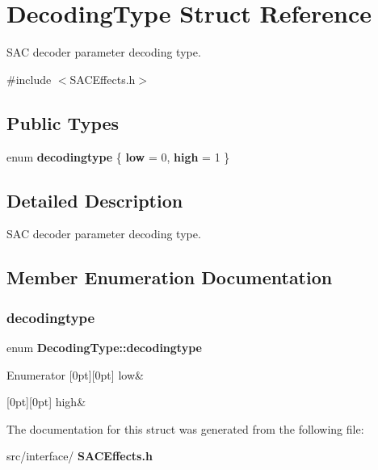 \section{Decoding\+Type Struct Reference}
\label{struct_decoding_type}


S\+AC decoder parameter decoding type.  




{\ttfamily \#include $<$S\+A\+C\+Effects.\+h$>$}

\subsection*{Public Types}
\begin{DoxyCompactItemize}
\item 
enum \textbf{ decodingtype} \{ \textbf{ low} = 0, 
\textbf{ high} = 1
 \}
\end{DoxyCompactItemize}


\subsection{Detailed Description}
S\+AC decoder parameter decoding type. 

\subsection{Member Enumeration Documentation}
\mbox{\label{struct_decoding_type_a8b3854652406458753c9b7da2068b822}} 
\subsubsection{decodingtype}
{\footnotesize\ttfamily enum \textbf{ Decoding\+Type\+::decodingtype}}

\begin{DoxyEnumFields}{Enumerator}
[0pt][0pt]{}\mbox{\label{struct_decoding_type_a8b3854652406458753c9b7da2068b822a1c83062a65b39a734cfb6393fa679425}} 
low&\\
\hline

[0pt][0pt]{}\mbox{\label{struct_decoding_type_a8b3854652406458753c9b7da2068b822a6184aedf8f82a070f5c054ead79d4d30}} 
high&\\
\hline

\end{DoxyEnumFields}


The documentation for this struct was generated from the following file\+:\begin{DoxyCompactItemize}
\item 
src/interface/\textbf{ S\+A\+C\+Effects.\+h}\end{DoxyCompactItemize}
